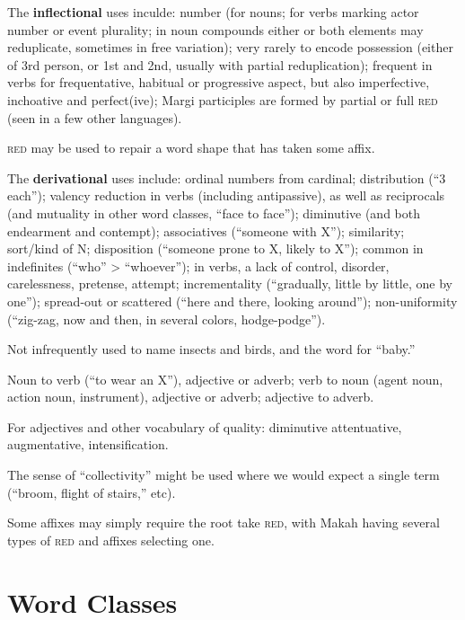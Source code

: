 \documentclass[11pt]{article}
\newcommand{\I}[1]{\textsc{#1}}   %
\begin{document}
The \textbf{inflectional} uses inculde: number (for nouns; for verbs
marking actor number or event plurality; in noun compounds either or
both elements may reduplicate, sometimes in free variation); very
rarely to encode possession (either of 3rd person, or 1st and 2nd,
usually with partial reduplication); frequent in verbs for
frequentative, habitual or progressive aspect, but also imperfective,
inchoative and perfect(ive); Margi participles are formed by partial
or full \I{red} (seen in a few other languages).

\I{red} may be used to repair a word shape that has taken some affix.

The \textbf{derivational} uses include: ordinal numbers from cardinal;
distribution (``3 each''); valency reduction in verbs (including
antipassive), as well as reciprocals (and mutuality in other word
classes, ``face to face''); diminutive (and both endearment and
contempt); associatives (``someone with X''); similarity; sort/kind of
N; disposition (``someone prone to X, likely to X''); common in
indefinites (``who'' > ``whoever''); in verbs, a lack of control,
disorder, carelessness, pretense, attempt; incrementality
(``gradually, little by little, one by one''); spread-out or scattered
(``here and there, looking around''); non-uniformity (``zig-zag, now
and then, in several colors, hodge-podge'').

Not infrequently used to name insects and birds, and the word for
``baby.'' 

Noun to verb (``to wear an X''), adjective or adverb; verb to noun
(agent noun, action noun, instrument), adjective or adverb; adjective
to adverb.

For adjectives and other vocabulary of quality: diminutive
attentuative, augmentative, intensification.

The sense of ``collectivity'' might be used where we would expect a
single term (``broom, flight of stairs,'' etc).

Some affixes may simply require the root take \I{red}, with Makah
having several types of \I{red} and affixes selecting one.


\section{Word Classes}
\end{document}
